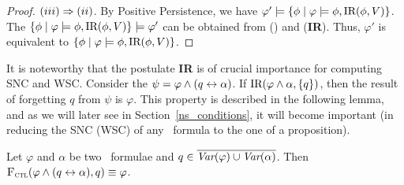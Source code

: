 \documentclass{article}
\begin{document}
\begin{proof}
$(iii)\Rightarrow (ii)$. %
By Positive Persistence, we have $\varphi' \models \{\phi \mid \varphi \models \phi, \textrm{IR}(\phi, V)\}$.
The  $\{\phi \mid \varphi \models \phi, \textrm{IR}(\phi, V)\} \models \varphi'$ can be obtained from (\W) and (\textbf{IR}).
Thus, $\varphi'$ is equivalent to $\{\phi \mid \varphi \models \phi, \textrm{IR}(\phi, V)\}$.
\end{proof}
%



It is noteworthy  that the postulate \textbf{IR} is of crucial importance for computing SNC and WSC. Consider the $\psi=\varphi\wedge (q\leftrightarrow \alpha)$. If $\textrm{IR}(\varphi \wedge \alpha, \{q\})$, then the result of forgetting $q$ from $\psi$ is $\varphi$. This property is described in the following lemma, and as we will later see in Section~\ref{ns_conditions}, it will become important (in reducing the SNC (WSC) of any \CTL\ formula to the one of a proposition).

\begin{lemma}\label{lem:KF:eq}
	Let $\varphi$ and $\alpha$ be two \CTL\ formulae and $q\in
		\overline{\textit{Var}(\varphi) \cup \textit{Var}(\alpha)}$. Then
	${\textsc{F}_{\textsc{ctl}}}(\varphi \wedge (q\leftrightarrow\alpha), q)\equiv \varphi$.
\end{lemma}
\end{document}
